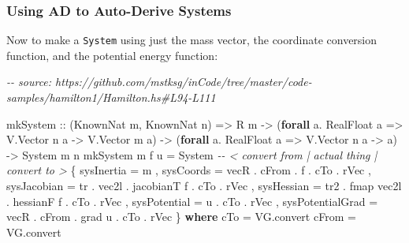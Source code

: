 \documentclass[]{article}
\newenvironment{Shaded}{}{}
\newcommand{\CommentTok}[1]{\textcolor[rgb]{0.38,0.63,0.69}{\textit{#1}}}
\newcommand{\DataTypeTok}[1]{\textcolor[rgb]{0.56,0.13,0.00}{#1}}
\newcommand{\FunctionTok}[1]{\textcolor[rgb]{0.02,0.16,0.49}{#1}}
\newcommand{\KeywordTok}[1]{\textcolor[rgb]{0.00,0.44,0.13}{\textbf{#1}}}
\newcommand{\NormalTok}[1]{#1}
\newcommand{\OperatorTok}[1]{\textcolor[rgb]{0.40,0.40,0.40}{#1}}
\newcommand{\OtherTok}[1]{\textcolor[rgb]{0.00,0.44,0.13}{#1}}
\begin{document}
\hypertarget{using-ad-to-auto-derive-systems}{%
\subsubsection{Using AD to Auto-Derive
Systems}\label{using-ad-to-auto-derive-systems}}

Now to make a \texttt{System} using just the mass vector, the coordinate
conversion function, and the potential energy function:

\begin{Shaded}
\begin{Highlighting}[]
\CommentTok{{-}{-} source: https://github.com/mstksg/inCode/tree/master/code{-}samples/hamilton1/Hamilton.hs\#L94{-}L111}

\NormalTok{mkSystem}
\OtherTok{    ::}\NormalTok{ (}\DataTypeTok{KnownNat}\NormalTok{ m, }\DataTypeTok{KnownNat}\NormalTok{ n)}
    \OtherTok{=>} \DataTypeTok{R}\NormalTok{ m}
    \OtherTok{{-}>}\NormalTok{ (}\KeywordTok{forall}\NormalTok{ a}\OperatorTok{.} \DataTypeTok{RealFloat}\NormalTok{ a }\OtherTok{=>} \DataTypeTok{V.Vector}\NormalTok{ n a }\OtherTok{{-}>} \DataTypeTok{V.Vector}\NormalTok{ m a)}
    \OtherTok{{-}>}\NormalTok{ (}\KeywordTok{forall}\NormalTok{ a}\OperatorTok{.} \DataTypeTok{RealFloat}\NormalTok{ a }\OtherTok{=>} \DataTypeTok{V.Vector}\NormalTok{ n a }\OtherTok{{-}>}\NormalTok{ a)}
    \OtherTok{{-}>} \DataTypeTok{System}\NormalTok{ m n}
\NormalTok{mkSystem m f u }\OtherTok{=} \DataTypeTok{System}
                    \CommentTok{{-}{-} < convert from      | actual thing | convert to >}
\NormalTok{    \{ sysInertia       }\OtherTok{=}\NormalTok{                     m}
\NormalTok{    , sysCoords        }\OtherTok{=}\NormalTok{ vecR }\OperatorTok{.}\NormalTok{ cFrom      }\OperatorTok{.}\NormalTok{ f            }\OperatorTok{.}\NormalTok{ cTo }\OperatorTok{.}\NormalTok{ rVec}
\NormalTok{    , sysJacobian      }\OtherTok{=}\NormalTok{ tr   }\OperatorTok{.}\NormalTok{ vec2l      }\OperatorTok{.}\NormalTok{ jacobianT f  }\OperatorTok{.}\NormalTok{ cTo }\OperatorTok{.}\NormalTok{ rVec}
\NormalTok{    , sysHessian       }\OtherTok{=}\NormalTok{ tr2  }\OperatorTok{.} \FunctionTok{fmap}\NormalTok{ vec2l }\OperatorTok{.}\NormalTok{ hessianF f   }\OperatorTok{.}\NormalTok{ cTo }\OperatorTok{.}\NormalTok{ rVec}
\NormalTok{    , sysPotential     }\OtherTok{=}\NormalTok{                     u            }\OperatorTok{.}\NormalTok{ cTo }\OperatorTok{.}\NormalTok{ rVec}
\NormalTok{    , sysPotentialGrad }\OtherTok{=}\NormalTok{ vecR }\OperatorTok{.}\NormalTok{ cFrom      }\OperatorTok{.}\NormalTok{ grad u       }\OperatorTok{.}\NormalTok{ cTo }\OperatorTok{.}\NormalTok{ rVec}
\NormalTok{    \}}
  \KeywordTok{where}
\NormalTok{    cTo   }\OtherTok{=}\NormalTok{ VG.convert}
\NormalTok{    cFrom }\OtherTok{=}\NormalTok{ VG.convert}
\end{Highlighting}
\end{Shaded}
\end{document}
